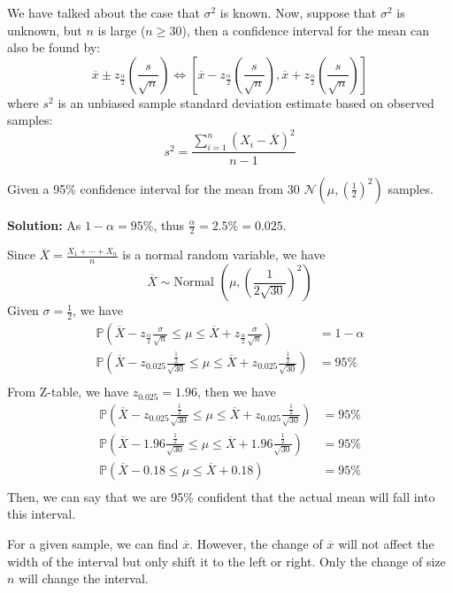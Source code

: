 We have talked about the case that \(\sigma^2\) is known. Now, suppose that \(\sigma^2\) is unknown, but \(n\) is large (\(n \geq 30\)), then a confidence interval for the mean can also be found by:
\[
  \overline{x} \pm z_{\frac{\alpha}{2}}\left(\frac{s}{\sqrt{n}}\right) \Longleftrightarrow \left[\overline{x} - z_{\frac{\alpha}{2}}\left(\frac{s}{\sqrt{n}}\right), \overline{x} + z_{\frac{\alpha}{2}}\left(\frac{s}{\sqrt{n}}\right)\right]
\]
where \(s^2\) is an unbiased sample standard deviation estimate based on observed samples:
\[
  s^2 = \dfrac{\sum_{i = 1}^n (X_i - \overline{X})^2}{n - 1}
\]

\begin{eg}
  Given a 95\% confidence interval for the mean from 30 \(\mathcal{N} \left(\mu, \left(\frac{1}{2}\right)^2\right)\) samples. 

  \textbf{Solution:} 
  As \(1 - \alpha = 95\%\), thus \(\frac{\alpha}{2} = 2.5\% = 0.025\). 

  Since \(\overline{X} = \frac{X_1 + \cdots + X_n}{n}\) is a normal random variable, we have
  \[
    \overline{X} \sim \text{Normal }\left(\mu, \left(\frac{1}{2\sqrt{30}}\right)^2\right)
  \]
  Given \(\sigma = \frac{1}{2}\), we have 
  \[
  \begin{aligned}
    \mathbb{P}\left(\overline{X} - z_{\frac{\alpha}{2}} \frac{\sigma}{\sqrt{n}} \leq \mu \leq \overline{X} + z_{\frac{\alpha}{2}} \frac{\sigma}{\sqrt{n}}\right) &= 1 - \alpha \\
    \mathbb{P}\left(\overline{X} - z_{0.025} \frac{\frac{1}{2}}{\sqrt{30}} \leq \mu \leq \overline{X} + z_{0.025} \frac{\frac{1}{2}}{\sqrt{30}}\right) &= 95\% \\
  \end{aligned}
  \]
  From Z-table, we have \(z_{0.025} = 1.96\), then we have 
  \[
  \begin{aligned}
    \mathbb{P}\left(\overline{X} - z_{0.025} \frac{\frac{1}{2}}{\sqrt{30}} \leq \mu \leq \overline{X} + z_{0.025} \frac{\frac{1}{2}}{\sqrt{30}}\right) &= 95\% \\
    \mathbb{P}\left(\overline{X} - 1.96 \frac{\frac{1}{2}}{\sqrt{30}} \leq \mu \leq \overline{X} + 1.96 \frac{\frac{1}{2}}{\sqrt{30}}\right) &= 95\% \\
    \mathbb{P}\left(\overline{X} - 0.18 \leq \mu \leq \overline{X} + 0.18\right) &= 95\% \\
  \end{aligned}
  \]
  Then, we can say that we are 95\% confident that the actual mean will fall into this interval. 
  \begin{remark}
    For a given sample, we can find \(\overline{x}\). However, the change of \(\overline{x}\) will not affect the width of the interval but only shift it to the left or right. Only the change of size \(n\) will change the interval. 
  \end{remark}
\end{eg}


